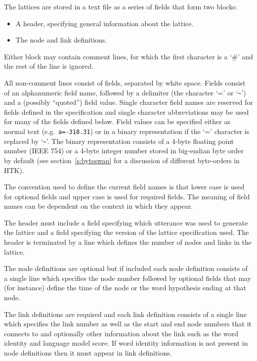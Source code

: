 The lattices are stored in a text file as a series of fields that form
two blocks:

\begin{itemize}
\item   A header, specifying general information about the lattice.
\item   The node and link definitions.
\end{itemize}

Either block may contain comment lines,
for which the first character is a `\#' and the rest of the line is
ignored.

All non-comment lines consist of fields, separated by white space.
Fields consist of an alphanumeric field name, followed by a delimiter
(the character `=' or `\verb|~|') and a (possibly ``quoted'') field
value.  Single character field names are reserved for fields defined
in the specification and single character abbreviations may be used
for many of the fields defined below. Field values can be specified
either as normal text (e.g.\ \verb|a=-318.31|) or in a binary
representation if the `=' character is replaced by `\verb|~|'. The
binary representation consists of a 4-byte floating point number (IEEE
754) or a 4-byte integer number stored in big-endian byte order by
default (see section~\ref{s:byteswap} for a discussion of different
byte-orders in HTK).

The convention used to define the current field
names is that lower case is used for
optional fields and upper case is used for required fields. The
meaning of field names can be dependent on the context in which they
appear.

The header must include a field specifying which utterance was used to
generate the lattice and a field specifying the version of the lattice
specification used.  The header is terminated by a line which defines
the number of nodes and links in the lattice.

The node definitions are optional but if included each node definition
consists of a single line which specifies the node number followed by
optional fields that may (for instance) define the time of the node or
the word hypothesis ending at that node.

The link definitions are required and each link definition consists of
a single line which specifies the link number as well as the start and
end node numbers that it connects to and optionally other information
about the link such as the word identity and language model score. If
word identity information is not present in node definitions then it
must appear in link definitions.


